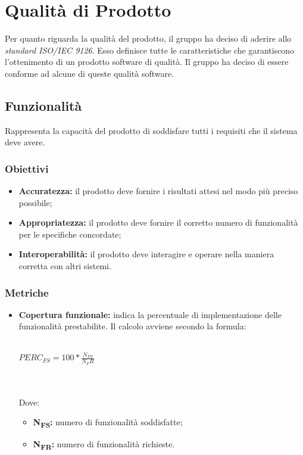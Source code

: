 \section{Qualità di Prodotto}
Per quanto riguarda la qualità del prodotto, il gruppo ha deciso di aderire allo \textit{standard ISO/IEC 9126\glos}. Esso definisce tutte le caratteristiche che garantiscono l'ottenimento di un prodotto software di qualità. Il gruppo ha deciso di essere conforme ad alcune di queste qualità software.

\subsection{Funzionalità}
Rappresenta la capacità del prodotto di soddisfare tutti i requisiti che il sistema deve avere.
\subsubsection{Obiettivi}
\begin{itemize}
	\item \textbf{Accuratezza:} il prodotto deve fornire i risultati attesi nel modo più preciso possibile;
	\item \textbf{Appropriatezza:} il prodotto deve fornire il corretto numero di funzionalità per le specifiche concordate;
	\item \textbf{Interoperabilità:} il prodotto deve interagire e operare nella maniera corretta con altri sistemi.
\end{itemize}
\subsubsection{Metriche}
\begin{itemize}
	\item \textbf{Copertura funzionale:} indica la percentuale di implementazione delle funzionalità prestabilite. Il calcolo avviene secondo la formula:\\\\
	\centerline{
		\begin{math}
		PERC_{FS}=100*\frac{N_{FS}}{N_FR}
		\end{math}
	}
	\\\\
	Dove:
	\begin{itemize}
		\item \textbf{N\textsubscript{FS}:} numero di funzionalità soddisfatte;
		\item \textbf{N\textsubscript{FR}:} numero di funzionalità richieste.
	\end{itemize}
\end{itemize}

